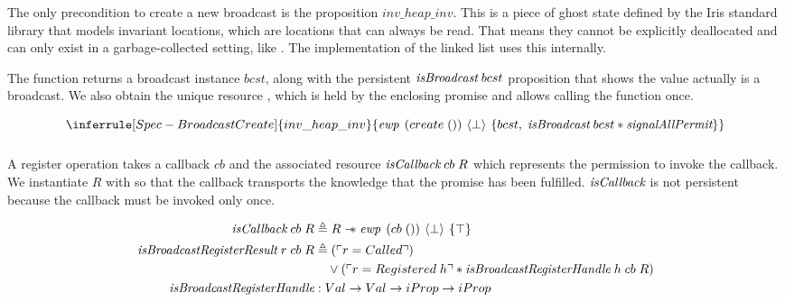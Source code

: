 \subsubsection{}
\label{sec:broadcast-spec-create}

The only precondition to create a new broadcast is the proposition \(inv\_heap\_inv\).
This is a piece of ghost state defined by the Iris standard library that models invariant locations, which are locations that can always be read.
That means they cannot be explicitly deallocated and can only exist in a garbage-collected setting, like \ocf{}.
The implementation of the linked list uses this internally.

The function returns a broadcast instance \(bcst\), along with the persistent \(\emph{isBroadcast}{}\; bcst\) proposition that shows the value actually is a broadcast.
We also obtain the unique resource \gssignal{}, which is held by the enclosing promise and allows calling the  function once.

\[
  \inferrule[Spec-BroadcastCreate]
  {inv\_heap\_inv}
  {\ewp{create\; ()}{\bot}{bcst,\; \gsIsBcst{}\; bcst \ast \gssignal{}}}
\]

\subsubsection{}
\label{sec:broadcast-spec-suspend}

A register operation takes a callback \(cb\) and the associated resource \(\emph{isCallback}{}\; cb\; R\) which represents the permission to invoke the callback.
We instantiate \(R\) with \gspdone{} so that the callback transports the knowledge that the promise has been fulfilled.
\(\emph{isCallback}{}\) is not persistent because the callback must be invoked only once.

\begin{align*}
  \gsIsCb{}\; cb\; R                            & \triangleq R \wand \ewp{cb\; ()}{\bot}{\top}                                                           \\
  \emph{isBroadcastRegisterResult}\; r\; cb\; R & \triangleq (\ulcorner r = Called \urcorner)                                                            \\
                                                & \quad \vee (\ulcorner r = Registered\; h \urcorner \ast \emph{isBroadcastRegisterHandle}\; h\; cb\; R) \\
  \emph{isBroadcastRegisterHandle}              & : Val \to Val \to iProp \to iProp
\end{align*}

